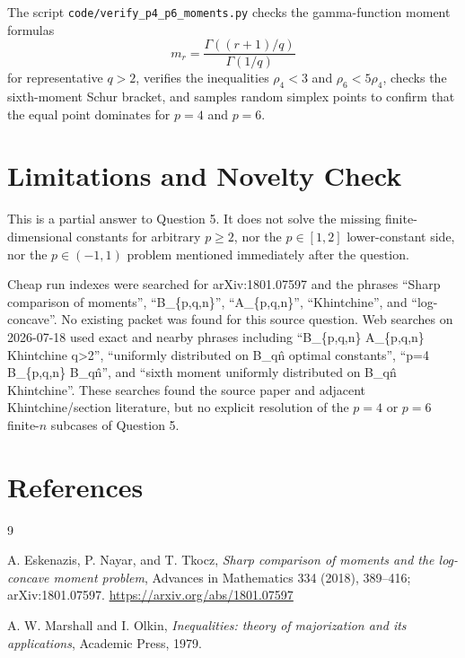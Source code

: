 \documentclass[11pt]{article}
\begin{document}
The script \texttt{code/verify\_p4\_p6\_moments.py} checks the gamma-function moment formulas
\[
m_r=\frac{\Gamma((r+1)/q)}{\Gamma(1/q)}
\]
for representative \(q>2\), verifies the inequalities \(\rho_4<3\) and \(\rho_6<5\rho_4\), checks the sixth-moment Schur bracket, and samples random simplex points to confirm that the equal point dominates for \(p=4\) and \(p=6\).

\section*{Limitations and Novelty Check}

This is a partial answer to Question 5.  It does not solve the missing finite-dimensional constants for arbitrary \(p\ge2\), nor the \(p\in[1,2]\) lower-constant side, nor the \(p\in(-1,1)\) problem mentioned immediately after the question.

Cheap run indexes were searched for arXiv:1801.07597 and the phrases ``Sharp comparison of moments'', ``B\_\{p,q,n\}'', ``A\_\{p,q,n\}'', ``Khintchine'', and ``log-concave''.  No existing packet was found for this source question.  Web searches on 2026-07-18 used exact and nearby phrases including ``B\_\{p,q,n\} A\_\{p,q,n\} Khintchine q>2'', ``uniformly distributed on B\_q\^n optimal constants'', ``p=4 B\_\{p,q,n\} B\_q\^n'', and ``sixth moment uniformly distributed on B\_q\^n Khintchine''.  These searches found the source paper and adjacent Khintchine/section literature, but no explicit resolution of the \(p=4\) or \(p=6\) finite-\(n\) subcases of Question 5.

\section*{References}

\begin{thebibliography}{9}

A. Eskenazis, P. Nayar, and T. Tkocz,
\emph{Sharp comparison of moments and the log-concave moment problem},
Advances in Mathematics 334 (2018), 389--416;
arXiv:1801.07597.
\url{https://arxiv.org/abs/1801.07597}

A. W. Marshall and I. Olkin,
\emph{Inequalities: theory of majorization and its applications},
Academic Press, 1979.

\end{thebibliography}
\end{document}
